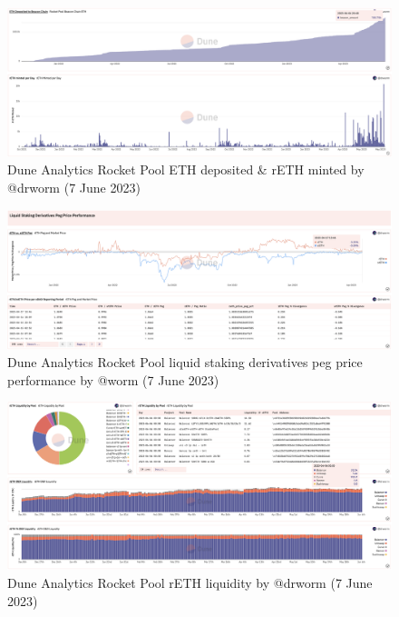 \documentclass[UTF8]{article}
\begin{document}
{\begin{figure}[htbp]
\begin{center}
\includegraphics[width=\linewidth]{images/rocketdrworm3}
\caption{Dune Analytics Rocket Pool ETH deposited \& rETH minted by @drworm  (7 June 2023)}
\label{fig:rocketdrworm3}
\end{center}
\end{figure}


\begin{figure}[htbp]
\begin{center}
\includegraphics[width=\linewidth]{images/rocketdrworm4}
\caption{Dune Analytics Rocket Pool liquid staking derivatives peg price performance by @worm  (7 June 2023)}
\label{fig:rocketdrworm4}
\end{center}
\end{figure}

\begin{figure}[htbp]
\begin{center}
\includegraphics[width=\linewidth]{images/rocketdrworm5}
\caption{Dune Analytics Rocket Pool rETH liquidity by @drworm  (7 June 2023)}
\label{fig:rocketdrworm5}
\end{center}
\end{figure}

}
\end{document}

